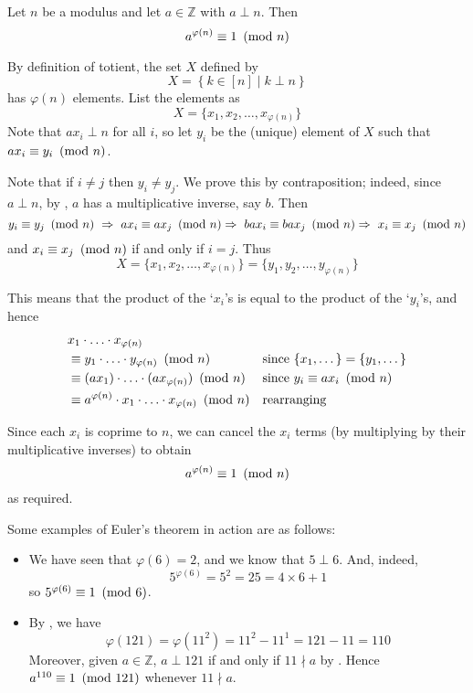 \begin{theorem}
\label{thmEuler}
Let $n$ be a modulus and let $a \in \mathbb{Z}$ with $a \perp n$. Then
\[ a^{\varphi(n)} \equiv 1 ~\left(\text{mod}~n\right) \]
\end{theorem}
\begin{cproof}
By definition of totient, the set $X$ defined by
\[ X = \left\{ k \in \left[n\right] \mid k \perp n \right\} \]
has $\varphi(n)$ elements. List the elements as
\[ X = \{ x_1, x_2, \dots, x_{\varphi(n)} \} \]
Note that $ax_i \perp n$ for all $i$, so let $y_i$ be the (unique) element of $X$ such that $ax_i \equiv y_i ~\left(\text{mod}~n\right)$.

Note that if $i \ne j$ then $y_i \ne y_j$. We prove this by contraposition; indeed, since $a \perp n$, by , $a$ has a multiplicative inverse, say $b$. Then
\[ y_i \equiv y_j \cmod{n}\ \Rightarrow\ ax_i \equiv ax_j \cmod{n} \Rightarrow\ bax_i \equiv bax_j \cmod{n} \Rightarrow\ x_i \equiv x_j \cmod{n} \]
and $x_i \equiv x_j ~\left(\text{mod}~n\right)$ if and only if $i=j$. Thus
\[ X = \{ x_1, x_2, \dots, x_{\varphi(n)} \} = \{ y_1, y_2, \dots, y_{\varphi(n)} \} \]

This means that the product of the `$x_i$'s is equal to the product of the `$y_i$'s, and hence
\begin{align*}
& x_1 \cdot {\dots} \cdot x_{\varphi(n)} &&
\\
&\equiv y_1 \cdot {\dots} \cdot y_{\varphi(n)} ~\left(\text{mod}~n\right) && \text{since $\{ x_1, \dots \} = \{ y_1, \dots \}$} \\
&\equiv (ax_1) \cdot {\dots} \cdot (ax_{\varphi(n)}) ~\left(\text{mod}~n\right) && \text{since $y_i \equiv ax_i ~\left(\text{mod}~n\right)$}\\
&\equiv a^{\varphi(n)} \cdot x_1 \cdot {\dots} \cdot x_{\varphi(n)} ~\left(\text{mod}~n\right) && \text{rearranging}
\end{align*}

Since each $x_i$ is coprime to $n$, we can cancel the $x_i$ terms (by multiplying by their multiplicative inverses) to obtain
\[ a^{\varphi(n)} \equiv 1 ~\left(\text{mod}~n\right) \]
as required.
\end{cproof}

\begin{example}
Some examples of Euler's theorem in action are as follows:
\begin{itemize}
\item We have seen that $\varphi(6) = 2$, and we know that $5 \perp 6$. And, indeed,
\[ 5^{\varphi(6)} = 5^2 = 25 = 4 \times 6 + 1 \]
so $5^{\varphi(6)} \equiv 1 ~\left(\text{mod}~6\right)$.
\item By , we have
\[ \varphi(121) = \varphi(11^2) = 11^2-11^1 = 121-11 = 110 \]
Moreover, given $a \in \mathbb{Z}$, $a \perp 121$ if and only if $11 \nmid a$ by . Hence $a^{110} \equiv 1 ~\left(\text{mod}~121\right)$ whenever $11 \nmid a$.
\end{itemize}
\end{example}

